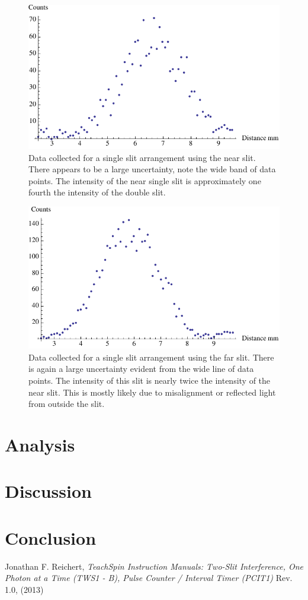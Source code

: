 \documentclass[prb,preprint]{revtex4-1}
\begin{document}
\begin{figure}[h!]
\centering
\includegraphics[width=6in]{singlenear.pdf}
\caption{Data collected for a single slit arrangement using the near slit. There appears to be a large uncertainty, note the wide band of data points. The intensity of the near single slit is approximately one fourth the intensity of the double slit.}
\label{singlenear}
\end{figure}

\begin{figure}[h!]
\centering
\includegraphics[width=6in]{singlefar.pdf}
\caption{Data collected for a single slit arrangement using the far slit. There is again a large uncertainty evident from the wide line of data points. The intensity of this slit is nearly twice the intensity of the near slit. This is mostly likely due to misalignment or reflected light from outside the slit.}
\label{singlefar}
\end{figure}


\section{Analysis}


\section{Discussion}


\section{Conclusion}

\begin{thebibliography}{1}

 Jonathan F. Reichert, \textit{TeachSpin Instruction Manuals: Two-Slit Interference, One Photon at a Time (TWS1 - B), Pulse Counter / Interval Timer (PCIT1)} Rev. 1.0, (2013)

\end{thebibliography}
\end{document}
